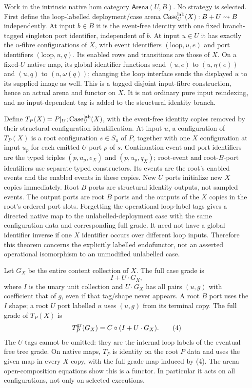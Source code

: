 \documentclass[11pt]{article}
\begin{document}
Work in the intrinsic native hom category $\mathsf{Arena}(U,B)$. No strategy is selected. First define the loop-labelled deployment/case arena $\operatorname{Case}^{\rm lab}_U(X):B+U\rightsquigarrow B$ independently. At input $b\in B$ it is the event-free identity with one fixed branch-tagged singleton port identifier, independent of $b$. At input $u\in U$ it has exactly the $u$-fibre configurations of $X$, with event identifiers $(\mathrm{loop},u,e)$ and port identifiers $(\mathrm{loop},u,q)$. Its enabled rows and transitions are those of $X$. On a fixed-$U$ native map, its global identifier functions send $(u,e)$ to $(u,\eta(e))$ and $(u,q)$ to $(u,\omega(q))$; changing the loop interface sends the displayed $u$ to its supplied image as well. This is a tagged disjoint input-fibre construction, hence an actual arena and functor on $X$. It is not ordinary pure input reindexing, and no input-dependent tag is added to the structural identity branch.

Define $T_P(X)=P|_U;\operatorname{Case}^{\rm lab}_U(X)$, with the event-free identity copies removed by their structural configuration identification. At input $u$, a configuration of $T_P(X)$ is a root configuration $s\in S_u$ of $P$, together with one $X$ configuration at input $u_p$ for each emitted $U$ port $p$ of $s$. Continuation event and port identifiers are the typed triples $(p,u_p,e_X)$ and $(p,u_p,q_X)$; root-event and root-$B$-port identifiers use separate typed constructors. Its events are the root's enabled events and the enabled events in these copies. New $U$ ports initialize new $X$ copies immediately. Root $B$ ports are structural identity outputs, not sampled events. The output ports are root $B$ ports and the outputs of the $X$ copies in the root's ordered port slots. Forgetting the operational loop-label tags gives a directed native map to the unlabelled-deployment case with the same configuration data and corresponding full grade. It need not have a global identifier inverse if one $X$ identifier occurs over different loop inputs. Therefore this theorem concerns the explicitly labelled endofunctor, not an asserted operational isomorphism to an unmodified unlabelled case.

Let $G_X$ be the entire content collection of $X$. The full case grade is
\[
 I+U\cdot G_X,
\]
where $I$ is the unary unit collection and $U\cdot G_X$ has all pairs $(u,g)$ with coefficient that of $g$, even if that tag/shape never appears. A root $B$ port uses the $I$ shape; a root $U$ port labelled $u$ uses $(u,g)$ from its terminal copy. The full grade of $T_P(X)$ is
\[
 T_P^{\rm gr}(G_X)=C\circ(I+U\cdot G_X).                  \tag{4}
\]
The $U$ tags cannot be omitted: they are the internal loop labels of the eventual free tree grade. On native maps, $T_P$ is identity on the root $P$ data and uses the given map in every $X$ copy, with the full grade map induced by (4). The arena open-composition equations show this is a functor. In particular it acts on all configurations, not only on selected executions.
\end{document}
